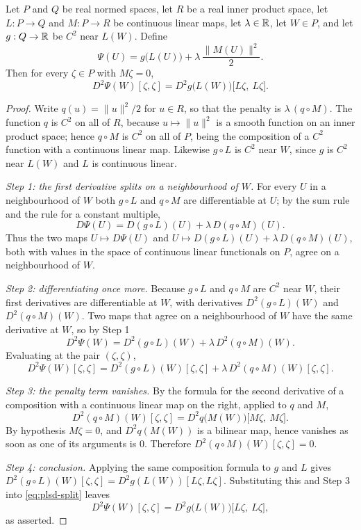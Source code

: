 \begin{lemma}
Let $P$ and $Q$ be real normed spaces, let $R$ be a real inner product space, let
$L:P\to Q$ and $M:P\to R$ be continuous linear maps, let $\lambda\in\mathbb{R}$, let $W\in P$,
and let $g:Q\to\mathbb{R}$ be $C^2$ near $L(W)$. Define
\[
  \Psi(U)=g\bigl(L(U)\bigr)+\lambda\,\frac{\|M(U)\|^2}{2}.
\]
Then for every $\zeta\in P$ with $M\zeta=0$,
\[
  D^2\Psi(W)[\zeta,\zeta]=D^2g\bigl(L(W)\bigr)\bigl[L\zeta,\ L\zeta\bigr].
\]
\end{lemma}
\begin{proof}
Write $q(u)=\|u\|^2/2$ for $u\in R$, so that the penalty is $\lambda\,(q\circ M)$. The
function $q$ is $C^2$ on all of $R$, because $u\mapsto\|u\|^2$ is a smooth function on an
inner product space; hence $q\circ M$ is $C^2$ on all of $P$, being the composition of a
$C^2$ function with a continuous linear map. Likewise $g\circ L$ is $C^2$ near $W$,
since $g$ is $C^2$ near $L(W)$ and $L$ is continuous linear.

\emph{Step 1: the first derivative splits on a neighbourhood of $W$.}
For every $U$ in a neighbourhood of $W$ both $g\circ L$ and $q\circ M$ are
differentiable at $U$; by the sum rule and the rule for a constant multiple,
\[
  D\Psi(U)=D(g\circ L)(U)+\lambda\,D(q\circ M)(U).
\]
Thus the two maps $U\mapsto D\Psi(U)$ and
$U\mapsto D(g\circ L)(U)+\lambda\,D(q\circ M)(U)$, both with values in the space of
continuous linear functionals on $P$, agree on a neighbourhood of $W$.

\emph{Step 2: differentiating once more.}
Because $g\circ L$ and $q\circ M$ are $C^2$ near $W$, their first derivatives are
differentiable at $W$, with derivatives $D^2(g\circ L)(W)$ and $D^2(q\circ M)(W)$. Two
maps that agree on a neighbourhood of $W$ have the same derivative at $W$, so by Step 1
\[
  D^2\Psi(W)=D^2(g\circ L)(W)+\lambda\,D^2(q\circ M)(W).
\]
Evaluating at the pair $(\zeta,\zeta)$,
\begin{equation}\label{eq:plsd-split}
  D^2\Psi(W)[\zeta,\zeta]
    =D^2(g\circ L)(W)[\zeta,\zeta]+\lambda\,D^2(q\circ M)(W)[\zeta,\zeta].
\end{equation}

\emph{Step 3: the penalty term vanishes.}
By the formula for the second derivative of a composition with a continuous linear map
on the right, applied to $q$ and $M$,
\[
  D^2(q\circ M)(W)[\zeta,\zeta]=D^2q\bigl(M(W)\bigr)\bigl[M\zeta,\ M\zeta\bigr].
\]
By hypothesis $M\zeta=0$, and $D^2q(M(W))$ is a bilinear map, hence vanishes as soon as
one of its arguments is $0$. Therefore $D^2(q\circ M)(W)[\zeta,\zeta]=0$.

\emph{Step 4: conclusion.}
Applying the same composition formula to $g$ and $L$ gives
$D^2(g\circ L)(W)[\zeta,\zeta]=D^2g(L(W))[L\zeta,L\zeta]$. Substituting this and
Step 3 into \eqref{eq:plsd-split} leaves
\[
  D^2\Psi(W)[\zeta,\zeta]=D^2g\bigl(L(W)\bigr)\bigl[L\zeta,\ L\zeta\bigr],
\]
as asserted.
\end{proof}
